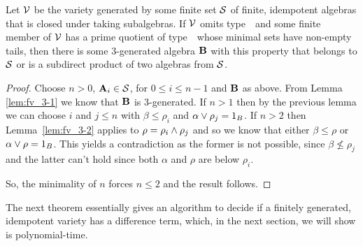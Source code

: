 

\begin{theorem}\label{thm:fv_3-4}
Let $\mathcal{V}$ be the variety generated by some finite set $\mathcal{S}$ of finite,
idempotent algebras that is closed under taking subalgebras. If\/ $\mathcal{V}$
omits type~\utyp\ and some finite member of $\mathcal{V}$ has a prime quotient 
of type~\atyp\
whose minimal sets have non-empty tails, then there is some
3-generated algebra $\mathbf{B}$ with this property that belongs to $\mathcal{S}$ or is a subdirect
product of two algebras from $\mathcal{S}$. 
\end{theorem}
\begin{proof}
Choose $n > 0$, $\mathbf{A}_i \in \mathcal{S}$, for $0 \le i \le n-1$ and $\mathbf{B}$
as above. From Lemma \ref{lem:fv_3-1} we know that $\mathbf{B}$ is
3-generated. If $n > 1$ then by the previous lemma we can choose $i$
and $j \le n$ with $\beta \le \rho_i$ and $\alpha \join \rho_j =
1_B$. If $n > 2$ then Lemma~\ref{lem:fv_3-2} applies to $\rho = \rho_i
\meet \rho_j$ and so we know that either $\beta \le \rho$ or $\alpha
\join \rho = 1_B$. This yields a contradiction as the former is not
possible, since $\beta \not\le \rho_j$ and the latter can't hold
since both $\alpha$ and $\rho$ are below $\rho_i$.

So, the minimality of $n$ forces $n\le 2$ and the result follows.
\end{proof}


The next theorem essentially gives an algorithm to decide if a finitely
generated, idempotent variety has a difference term, which, in the next
section, we will show is polynomial-time. 

